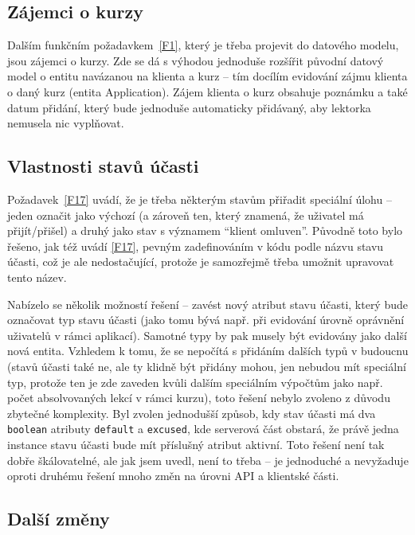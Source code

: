 \subsection{Zájemci o kurzy}

Dalším funkčním požadavkem~\ref{F1}, který je třeba projevit do datového modelu, jsou zájemci o kurzy. Zde se dá s výhodou jednoduše rozšířit původní datový model o entitu navázanou na klienta a kurz -- tím docílím evidování zájmu klienta o daný kurz (entita Application). Zájem klienta o kurz obsahuje poznámku a také datum přidání, který bude jednoduše automaticky přidávaný, aby lektorka nemusela nic vyplňovat.

\subsection{Vlastnosti stavů účasti}

Požadavek~\ref{F17} uvádí, že je třeba některým stavům přiřadit speciální úlohu -- jeden označit jako výchozí (a zároveň ten, který znamená, že uživatel má přijít/přišel) a druhý jako stav s významem \enquote{klient omluven}. Původně toto bylo řešeno, jak též uvádí \ref{F17}, pevným zadefinováním v kódu podle názvu stavu účasti, což je ale nedostačující, protože je samozřejmě třeba umožnit upravovat tento název.

Nabízelo se několik možností řešení -- zavést nový atribut stavu účasti, který bude označovat typ stavu účasti (jako tomu bývá např. při evidování úrovně oprávnění uživatelů v rámci aplikací). Samotné typy by pak musely být evidovány jako další nová entita. Vzhledem k tomu, že se nepočítá s přidáním dalších typů v budoucnu (stavů účasti také ne, ale ty klidně být přidány mohou, jen nebudou mít speciální typ, protože ten je zde zaveden kvůli dalším speciálním výpočtům jako např. počet absolvovaných lekcí v rámci kurzu), toto řešení nebylo zvoleno z důvodu zbytečné komplexity. Byl zvolen jednodušší způsob, kdy stav účasti má dva \verb|boolean| atributy \verb|default| a \verb|excused|, kde serverová část obstará, že právě jedna instance stavu účasti bude mít příslušný atribut aktivní. Toto řešení není tak dobře škálovatelné, ale jak jsem uvedl, není to třeba -- je jednoduché a nevyžaduje oproti druhému řešení mnoho změn na úrovni API a klientské části.

\subsection{Další změny}

